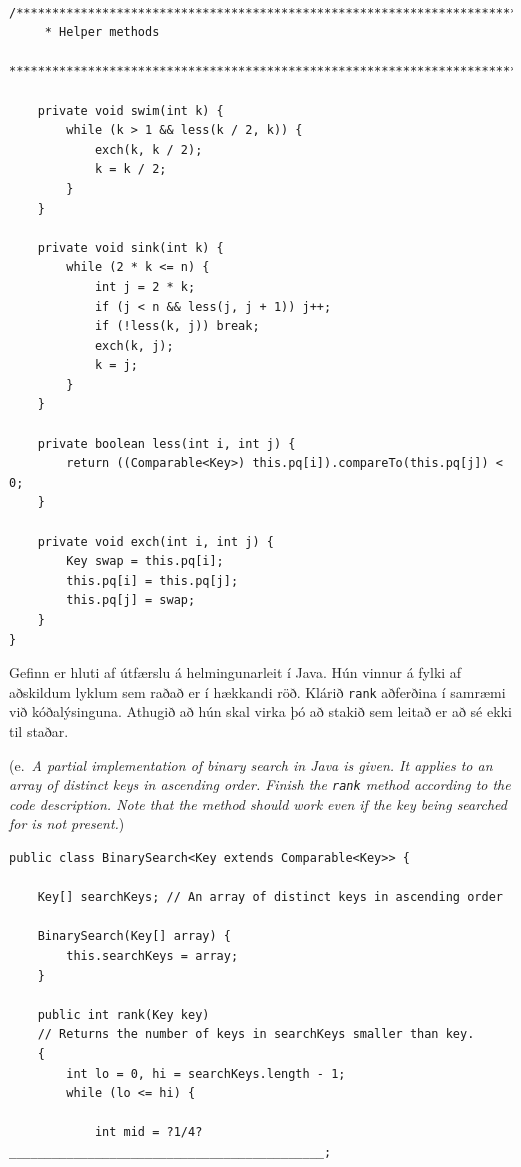 \documentclass[addpoints]{exam}
\newcommand{\eng}[1]{(e.\ \emph{#1})}
\begin{document}
\begin{questions}
\begin{verbatim}
    /***************************************************************************
     * Helper methods
     ***************************************************************************/

    private void swim(int k) {
        while (k > 1 && less(k / 2, k)) {
            exch(k, k / 2);
            k = k / 2;
        }
    }

    private void sink(int k) {
        while (2 * k <= n) {
            int j = 2 * k;
            if (j < n && less(j, j + 1)) j++;
            if (!less(k, j)) break;
            exch(k, j);
            k = j;
        }
    }

    private boolean less(int i, int j) {
        return ((Comparable<Key>) this.pq[i]).compareTo(this.pq[j]) < 0;
    }

    private void exch(int i, int j) {
        Key swap = this.pq[i];
        this.pq[i] = this.pq[j];
        this.pq[j] = swap;
    }
}
\end{verbatim}


	\question[4] Gefinn er hluti af útfærslu á helmingunarleit í Java. Hún vinnur á fylki af aðskildum lyklum sem raðað er í hækkandi röð. Klárið \texttt{rank} aðferðina í samræmi við kóðalýsinguna. Athugið að hún skal virka þó að stakið sem leitað er að sé ekki til staðar.

	\eng{A partial implementation of binary search in Java is given. It applies to an array of distinct keys in ascending order. Finish the \texttt{rank} method according to the code description. Note that the method should work even if the key being searched for is not present.}

	\begin{verbatim}
public class BinarySearch<Key extends Comparable<Key>> {

    Key[] searchKeys; // An array of distinct keys in ascending order

    BinarySearch(Key[] array) {
        this.searchKeys = array;
    }

    public int rank(Key key)
    // Returns the number of keys in searchKeys smaller than key.
    {
        int lo = 0, hi = searchKeys.length - 1;
        while (lo <= hi) {
        
            int mid = ?1/4?____________________________________________;


\end{verbatim}
\end{questions}
\end{document}
